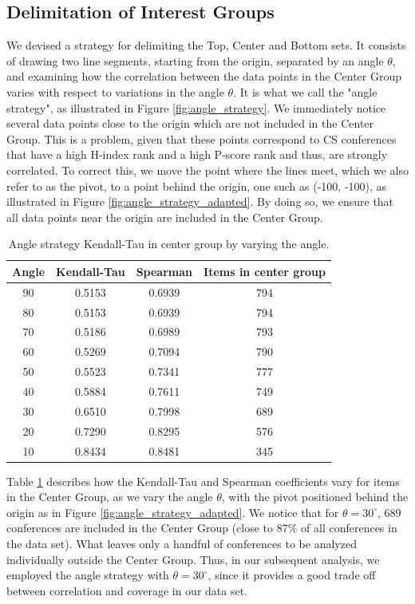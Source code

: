 \documentclass[notitlepage]{svjour3}
\begin{document}
\subsection{Delimitation of Interest Groups}
\label{ssec:delimitation_strategy}

We devised a strategy for delimiting the Top, Center and Bottom sets. 
It consists of drawing two line segments, starting from
the origin, separated by an angle $ \theta $, and examining
how the correlation between the data points in the 
Center Group varies with respect to variations in the angle 
$ \theta $. It is what we call the "angle strategy", as 
illustrated in Figure \ref{fig:angle_strategy}. We immediately 
notice several data points close to the origin
which are not included in the Center Group. This is a problem, 
given that these points correspond to CS conferences that have a high H-index rank and a high
P-score rank and thus, are strongly correlated. To
correct this, we move the point where the lines meet, which we also
refer to as the pivot, to a point behind the origin, one
such as (-100, -100), as illustrated in Figure \ref{fig:angle_strategy_adapted}. 
By doing so, we ensure that all data points near the origin are included in the
Center Group.

\begin{table}[ht!]
\centering
 \begin{tabular}{c c c c} 
 \toprule
 Angle & Kendall-Tau & Spearman & Items in center group \\ 
 \midrule
 90 & 0.5153 & 0.6939 & 794 \\ 
 80 & 0.5153 & 0.6939 & 794 \\
 70 & 0.5186 & 0.6989 & 793 \\
 60 & 0.5269 & 0.7094 & 790 \\
 50 & 0.5523 & 0.7341 & 777 \\
 40 & 0.5884 & 0.7611 & 749 \\
 30 & 0.6510 & 0.7998 & 689 \\
 20 & 0.7290 & 0.8295 & 576 \\
 10 & 0.8434 & 0.8481 & 345 \\
 \bottomrule
 \end{tabular}
 \caption{Angle strategy Kendall-Tau in center group by varying the angle.}
 \label{tab:angle_strategy}
\end{table}

Table \ref{tab:angle_strategy} describes how the Kendall-Tau and Spearman coefficients vary for items 
in the Center Group, as we vary the angle $ \theta $, with the pivot positioned behind 
the origin as in Figure \ref{fig:angle_strategy_adapted}. We notice that for $ \theta = 30^{\circ} $, 
689 conferences are included in the Center
Group (close to 87\% of all conferences in the data set). What leaves only a handful of conferences to
be analyzed individually outside the Center Group.
Thus, in our subsequent 
analysis, we employed the angle strategy with $ \theta = 30^{\circ} $, since it provides 
a good trade off between correlation and coverage in our data set.
\end{document}
